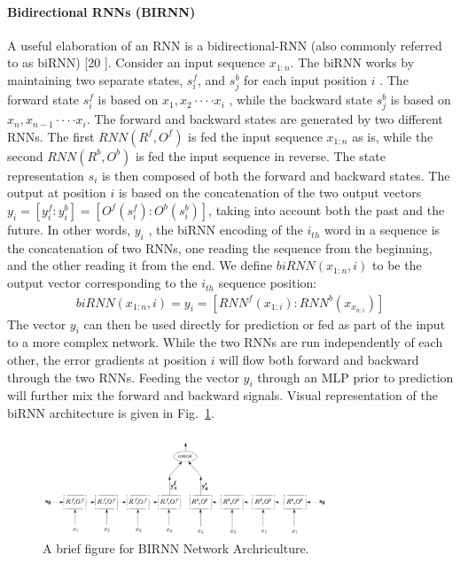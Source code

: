 \documentclass{article}
\begin{document}
\paragraph{Bidirectional RNNs (BIRNN)}
A useful elaboration of an RNN is a bidirectional-RNN (also commonly referred to as biRNN) [20 ]. Consider an input sequence $x_{1:n}$. The biRNN works by maintaining two separate states, $s^f_i$, and $s^b_j$ for each input position $i$ . The forward state $s^f_i$ is based on $x_1,x_2\cdot\cdot\cdot\cdot x_i$ , while the backward state $s^b_j$ is based on $x_n,x_{n-1}\cdot\cdot\cdot\cdot x_i$. The forward and backward states are generated by two different RNNs. The first $RNN(R^f,O^f)$ is fed the input sequence $x_{1:n}$ as is, while the second $RNN(R^b,O^b)$ is fed the input sequence in reverse. The state representation $s_i$ is then composed of both the forward and backward states. The output at position $i$ is based on the concatenation of the two output vectors $y_i=[y^f_i:y^b_i]=[O^f(s^f_i):O^b(s^b_i)]$, taking into account both the past and the future. In other words, $y_i$ , the biRNN encoding of the $i_{th}$ word in a sequence is the concatenation of two RNNs, one reading the sequence from the beginning, and the other reading it from the end.
We define $biRNN(x_{1:n},i)$ to  be the output vector corresponding to the $i_{th}$ sequence position:
\begin{align}
	biRNN(x_{1:n},i)=y_i=[RNN^f(x_{1:i}):RNN^b(x_{x_{n:i}})]
\end{align}
The vector $y_i$ can then be used directly for prediction or fed as part of the input to a more complex network. While the two RNNs are run independently of each other, the error gradients at position $i$ will flow both forward and backward through the two RNNs. Feeding the vector $y_i$  through an MLP prior to prediction will further mix the forward and backward signals. Visual representation of the biRNN architecture is given in Fig.~\ref{fig:BINN_figure}.

\begin{figure}[!htp]
	\begin{centering}
		\includegraphics[width=0.8\textwidth]{BIRNN.png}
		\caption{A brief figure for BIRNN Network Archriculture.}
		\label{fig:BINN_figure} 
	\end{centering}
\end{figure}
\end{document}
